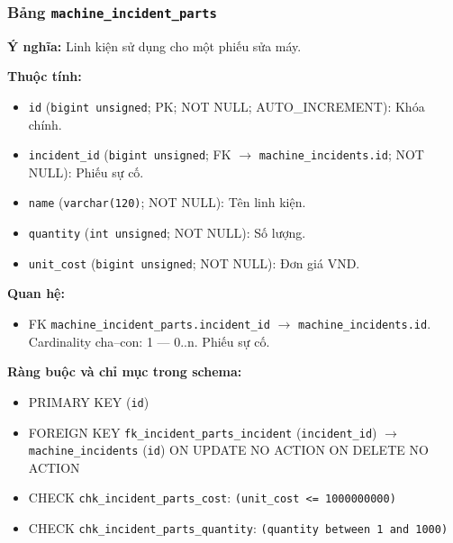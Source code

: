 \subsubsection{Bảng \texttt{machine\_incident\_parts}}

\textbf{Ý nghĩa:} Linh kiện sử dụng cho một phiếu sửa máy.\par

\textbf{Thuộc tính:}

\begin{itemize}

\item \texttt{id} (\texttt{bigint unsigned}; PK; NOT NULL; AUTO_INCREMENT): Khóa chính.

\item \texttt{incident\_id} (\texttt{bigint unsigned}; FK $\rightarrow$ \texttt{machine\_incidents.id}; NOT NULL): Phiếu sự cố.

\item \texttt{name} (\texttt{varchar(120)}; NOT NULL): Tên linh kiện.

\item \texttt{quantity} (\texttt{int unsigned}; NOT NULL): Số lượng.

\item \texttt{unit\_cost} (\texttt{bigint unsigned}; NOT NULL): Đơn giá VND.

\end{itemize}

\textbf{Quan hệ:}

\begin{itemize}

\item FK \texttt{machine\_incident\_parts.incident\_id} $\rightarrow$ \texttt{machine\_incidents.id}. Cardinality cha--con: 1 — 0..n. Phiếu sự cố.

\end{itemize}

\textbf{Ràng buộc và chỉ mục trong schema:}

\begin{itemize}

\item PRIMARY KEY (\texttt{id})

\item FOREIGN KEY \texttt{fk\_incident\_parts\_incident} (\texttt{incident\_id}) $\rightarrow$ \texttt{machine\_incidents} (\texttt{id}) ON UPDATE NO ACTION ON DELETE NO ACTION

\item CHECK \texttt{chk\_incident\_parts\_cost}: \texttt{(unit\_cost <= 1000000000)}

\item CHECK \texttt{chk\_incident\_parts\_quantity}: \texttt{(quantity between 1 and 1000)}

\end{itemize}

